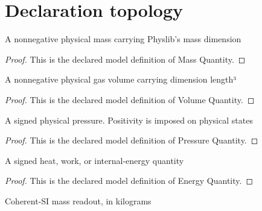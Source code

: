 \section{Declaration topology}
\begin{definition}
  \label{def:physics:phyx-mini-0432:phyxminiproblems-problemphyxmini0432-massquantity}
  A nonnegative physical mass carrying Physlib's mass dimension
\end{definition}
\begin{proof}
  This is the declared model definition of Mass Quantity.
\end{proof}
\begin{definition}
  \label{def:physics:phyx-mini-0432:phyxminiproblems-problemphyxmini0432-volumequantity}
  A nonnegative physical gas volume carrying dimension length³
\end{definition}
\begin{proof}
  This is the declared model definition of Volume Quantity.
\end{proof}
\begin{definition}
  \label{def:physics:phyx-mini-0432:phyxminiproblems-problemphyxmini0432-pressurequantity}
  A signed physical pressure. Positivity is imposed on physical states
\end{definition}
\begin{proof}
  This is the declared model definition of Pressure Quantity.
\end{proof}
\begin{definition}
  \label{def:physics:phyx-mini-0432:phyxminiproblems-problemphyxmini0432-energyquantity}
  A signed heat, work, or internal-energy quantity
\end{definition}
\begin{proof}
  This is the declared model definition of Energy Quantity.
\end{proof}
\begin{definition}
  \label{def:physics:phyx-mini-0432:phyxminiproblems-problemphyxmini0432-massinkilograms}
  Coherent-SI mass readout, in kilograms
\end{definition}
